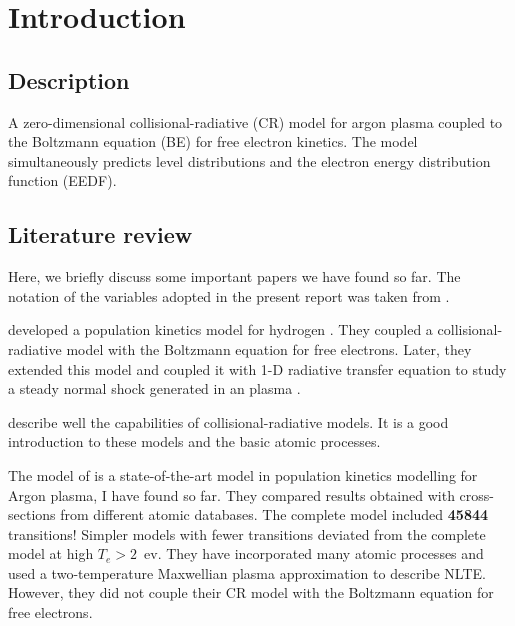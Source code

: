 
\section{Introduction} \label{sec:Introduction}

\subsection{Description} \label{sec:Description}


A zero-dimensional collisional-radiative (CR) model for argon plasma coupled to the Boltzmann equation (BE) for free electron kinetics. The model simultaneously predicts level distributions and the electron energy distribution function (EEDF). 


\subsection{Literature review} \label{sec:Literature}

Here, we briefly discuss some important papers we have found so far. The notation of the variables adopted in the  present report was taken from \cite{kapper2011ionizing}. 

\cite{colonna2001coupled} developed a population kinetics model for hydrogen . They coupled a collisional-radiative model with the Boltzmann equation for free electrons. Later, they extended this model and coupled it with 1-D radiative transfer equation  to study a steady normal shock generated in an  plasma \citep{capitelli2013coupling}.

\cite{hartgers2001crmodel} describe well the capabilities of collisional-radiative models. It is a good introduction to these models and the basic atomic processes.

The model of \cite{chung2021population} is a state-of-the-art model in population kinetics modelling for Argon plasma, I have found so far. They compared results obtained with cross-sections from different atomic databases.  The complete model included \textbf{45844} transitions! Simpler models with fewer transitions deviated from the complete model at high $T_e > 2$~ev. They have incorporated many atomic processes and used a two-temperature Maxwellian plasma approximation to describe NLTE. However, they did not couple their CR model with the Boltzmann equation for free electrons.   

